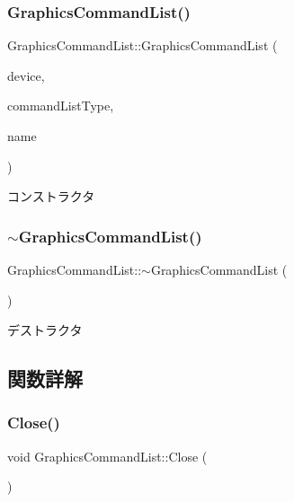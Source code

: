 \subsubsection{\texorpdfstring{Graphics\+Command\+List()}{GraphicsCommandList()}}
{\footnotesize\ttfamily Graphics\+Command\+List\+::\+Graphics\+Command\+List (\begin{DoxyParamCaption}\item[{std\+::shared\+\_\+ptr$<$ \mbox{\hyperlink{class_device}{Device}} $>$}]{device,  }\item[{D3\+D12\+\_\+\+C\+O\+M\+M\+A\+N\+D\+\_\+\+L\+I\+S\+T\+\_\+\+T\+Y\+PE}]{command\+List\+Type,  }\item[{const std\+::wstring \&}]{name }\end{DoxyParamCaption})}



コンストラクタ 

\mbox{\label{class_graphics_command_list_aa115f0c056e3e5f81333852202e5dbaa}} 
\subsubsection{\texorpdfstring{$\sim$\+Graphics\+Command\+List()}{~GraphicsCommandList()}}
{\footnotesize\ttfamily Graphics\+Command\+List\+::$\sim$\+Graphics\+Command\+List (\begin{DoxyParamCaption}{ }\end{DoxyParamCaption})}



デストラクタ 



\subsection{関数詳解}
\mbox{\label{class_graphics_command_list_afafd3a85240e8ff36af439de3b8e5f7f}} 
\subsubsection{\texorpdfstring{Close()}{Close()}}
{\footnotesize\ttfamily void Graphics\+Command\+List\+::\+Close (\begin{DoxyParamCaption}{ }\end{DoxyParamCaption})}



